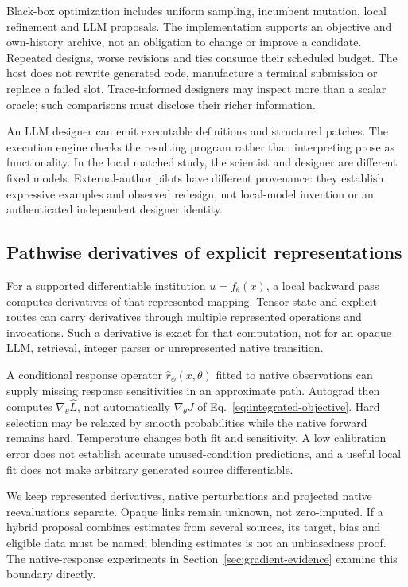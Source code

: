 Black-box optimization includes uniform sampling, incumbent mutation,
local refinement and LLM proposals. The implementation supports an objective
and own-history archive, not an obligation to change or improve a candidate.
Repeated designs, worse revisions and ties consume their scheduled budget.
The host does not rewrite generated code, manufacture a terminal submission
or replace a failed slot. Trace-informed designers may inspect more than a
scalar oracle; such comparisons must disclose their richer information.

An LLM designer can emit executable definitions and structured patches. The
execution engine checks the resulting program rather than interpreting prose
as functionality. In the local matched study, the scientist and designer are
different fixed models. External-author pilots have different provenance:
they establish expressive examples and observed redesign, not local-model
invention or an authenticated independent designer identity.

\subsection{Pathwise derivatives of explicit representations}
For a supported differentiable institution $ u=f_\theta(x)$, a local backward
pass computes derivatives of that represented mapping. Tensor state and
explicit routes can carry derivatives through multiple represented operations
and invocations. Such a derivative is exact for that computation, not for an
opaque LLM, retrieval, integer parser or unrepresented native transition.

A conditional response operator $\widehat r_\phi(x,\theta)$ fitted to native
observations can supply missing response sensitivities in an approximate
path. Autograd then computes $\nabla_\theta\widehat L$, not automatically
$\nabla_\theta J$ of Eq.~\eqref{eq:integrated-objective}. Hard selection may be
relaxed by smooth probabilities while the native forward remains hard.
Temperature changes both fit and sensitivity. A low calibration error does
not establish accurate unused-condition predictions, and a useful local fit
does not make arbitrary generated source differentiable.

We keep represented derivatives, native perturbations and projected native
reevaluations separate. Opaque links remain unknown, not zero-imputed. If a
hybrid proposal combines estimates from several sources, its target, bias
and eligible data must be named; blending estimates is not an unbiasedness proof.
The native-response experiments in Section~\ref{sec:gradient-evidence} examine
this boundary directly.

